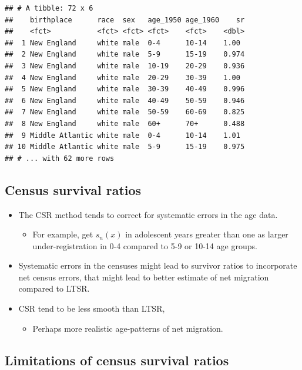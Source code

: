 \documentclass[
]{book}
\providecommand{\tightlist}{%
  \setlength{\itemsep}{0pt}\setlength{\parskip}{0pt}}
\begin{document}
\begin{verbatim}
## # A tibble: 72 x 6
##    birthplace      race  sex   age_1950 age_1960    sr
##    <fct>           <fct> <fct> <fct>    <fct>    <dbl>
##  1 New England     white male  0-4      10-14    1.00 
##  2 New England     white male  5-9      15-19    0.974
##  3 New England     white male  10-19    20-29    0.936
##  4 New England     white male  20-29    30-39    1.00 
##  5 New England     white male  30-39    40-49    0.996
##  6 New England     white male  40-49    50-59    0.946
##  7 New England     white male  50-59    60-69    0.825
##  8 New England     white male  60+      70+      0.488
##  9 Middle Atlantic white male  0-4      10-14    1.01 
## 10 Middle Atlantic white male  5-9      15-19    0.975
## # ... with 62 more rows
\end{verbatim}

\hypertarget{census-survival-ratios-1}{%
\subsection{Census survival ratios}\label{census-survival-ratios-1}}

\begin{itemize}
\tightlist
\item
  The CSR method tends to correct for systematic errors in the age data.

  \begin{itemize}
  \tightlist
  \item
    For example, get \(s_n(x)\) in adolescent years greater than one as larger under-registration in 0-4 compared to 5-9 or 10-14 age groups.
  \end{itemize}
\item
  Systematic errors in the censuses might lead to survivor ratios to incorporate net census errors, that might lead to better estimate of net migration compared to LTSR.
\item
  CSR tend to be less smooth than LTSR,

  \begin{itemize}
  \tightlist
  \item
    Perhaps more realistic age-patterns of net migration.
  \end{itemize}
\end{itemize}

\hypertarget{limitations-of-census-survival-ratios}{%
\subsection{Limitations of census survival ratios}\label{limitations-of-census-survival-ratios}}
\end{document}
